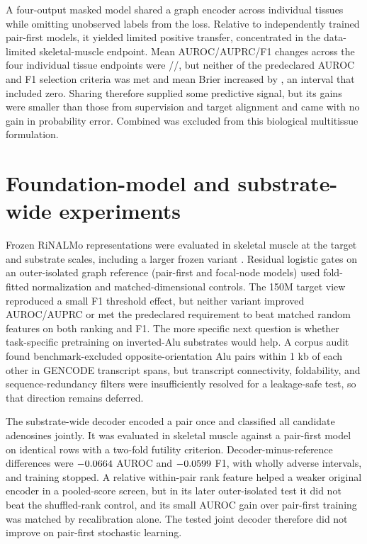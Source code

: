 \documentclass[9pt,twoside]{pnas-new}
\begin{document}
A four-output masked model shared a graph encoder across individual tissues while omitting unobserved labels from the loss. Relative to independently trained pair-first models, it yielded limited positive transfer, concentrated in the data-limited skeletal-muscle endpoint. Mean AUROC/AUPRC/F1 changes across the four individual tissue endpoints were \SharedMacroDeltaAUROCMedian{}/\SharedMacroDeltaAUPRCMedian{}/\SharedMacroDeltaFOneMedian{}, but neither of the predeclared AUROC and F1 selection criteria was met and mean Brier increased by \SharedMacroDeltaBrierMedian{}, an interval that included zero. Sharing therefore supplied some predictive signal, but its gains were smaller than those from supervision and target alignment and came with no gain in probability error. Combined was excluded from this biological multitissue formulation.

\section{Foundation-model and substrate-wide experiments}\label{si:foundation}

Frozen RiNALMo representations were evaluated in skeletal muscle at the target and substrate scales, including a larger frozen variant \cite{Penic2025}. Residual logistic gates on an outer-isolated graph reference (pair-first and focal-node models) used fold-fitted normalization and matched-dimensional controls. The 150M target view reproduced a small F1 threshold effect, but neither variant improved AUROC/AUPRC or met the predeclared requirement to beat matched random features on both ranking and F1. The more specific next question is whether task-specific pretraining on inverted-Alu substrates would help. A corpus audit found \PretrainingCandidatePairs{} benchmark-excluded opposite-orientation Alu pairs within 1 kb of each other in GENCODE transcript spans, but transcript connectivity, foldability, and sequence-redundancy filters were insufficiently resolved for a leakage-safe test, so that direction remains deferred.

The substrate-wide decoder encoded a pair once and classified all candidate adenosines jointly. It was evaluated in skeletal muscle against a pair-first model on identical rows with a two-fold futility criterion. Decoder-minus-reference differences were $-0.0664{}$ AUROC and $-0.0599{}$ F1, with wholly adverse intervals, and training stopped. A relative within-pair rank feature helped a weaker original encoder in a pooled-score screen, but in its later outer-isolated test it did not beat the shuffled-rank control, and its small AUROC gain over pair-first training was matched by recalibration alone. The tested joint decoder therefore did not improve on pair-first stochastic learning.
\end{document}

